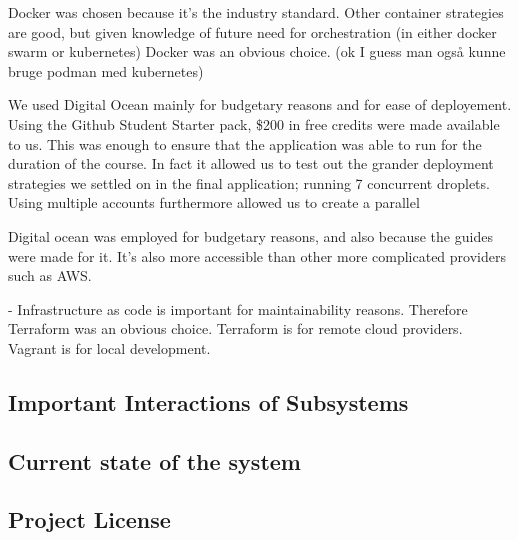 
Docker was chosen because it's the industry standard. Other container strategies are good, but given knowledge of future need for orchestration (in either docker swarm or kubernetes) Docker was an obvious choice.  (ok I guess man også kunne bruge podman med kubernetes)

We used Digital Ocean mainly for budgetary reasons and for ease of deployement. Using the Github Student Starter pack, \$200 in free credits were made available to us. This was enough to ensure that the application was able to run for the duration of the course. In fact it allowed us to test out the grander deployment strategies we settled on in the final application; running 7 concurrent droplets. Using multiple accounts furthermore allowed us to create a parallel  


Digital ocean was employed for budgetary reasons, and also because the guides were made for it.
It's also more accessible than other more complicated providers such as AWS. 


- Infrastructure as code is important for maintainability reasons. Therefore Terraform was an obvious choice.
Terraform is for remote cloud providers. Vagrant is for local development. 

\subsection{Important Interactions of Subsystems}

\subsection{Current state of the system}

\subsection{Project License}
